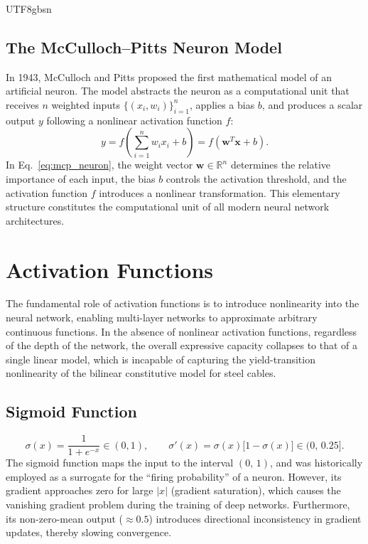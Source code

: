 \documentclass[a4paper,12pt]{report}
\begin{document}
\begin{CJK}{UTF8}{gbsn}
\subsection{The McCulloch--Pitts Neuron Model}
\label{subsec:mcp_neuron}

In 1943, McCulloch and Pitts proposed the first mathematical model of an artificial
neuron. The model abstracts the neuron as a computational unit that receives $n$ weighted
inputs $\{(x_i, w_i)\}_{i=1}^{n}$, applies a bias $b$, and produces a scalar output $y$
following a nonlinear activation function $f$:
\begin{equation}
  y = f\!\left(\sum_{i=1}^{n} w_i x_i + b\right) = f(\mathbf{w}^T \mathbf{x} + b).
  \label{eq:mcp_neuron}
\end{equation}
In Eq.~\eqref{eq:mcp_neuron}, the weight vector $\mathbf{w} \in \mathbb{R}^n$ determines
the relative importance of each input, the bias $b$ controls the activation threshold, and
the activation function $f$ introduces a nonlinear transformation. This elementary
structure constitutes the computational unit of all modern neural network architectures.

\section{Activation Functions}
\label{sec:activation}

The fundamental role of activation functions is to introduce nonlinearity into the neural
network, enabling multi-layer networks to approximate arbitrary continuous functions.
In the absence of nonlinear activation functions, regardless of the depth of the network,
the overall expressive capacity collapses to that of a single linear model, which is
incapable of capturing the yield-transition nonlinearity of the bilinear constitutive
model for steel cables.

\subsection{Sigmoid Function}
\label{subsec:sigmoid}

\begin{equation}
  \sigma(x) = \frac{1}{1+e^{-x}} \in (0,1), \qquad
  \sigma'(x) = \sigma(x)\bigl[1-\sigma(x)\bigr] \in (0,\,0.25].
  \label{eq:sigmoid}
\end{equation}
The sigmoid function maps the input to the interval $(0,\,1)$, and was historically
employed as a surrogate for the ``firing probability'' of a neuron. However, its gradient
approaches zero for large $|x|$ (gradient saturation), which causes the vanishing gradient
problem during the training of deep networks. Furthermore, its non-zero-mean output
($\approx 0.5$) introduces directional inconsistency in gradient updates, thereby slowing
convergence.


\end{CJK}
\end{document}
